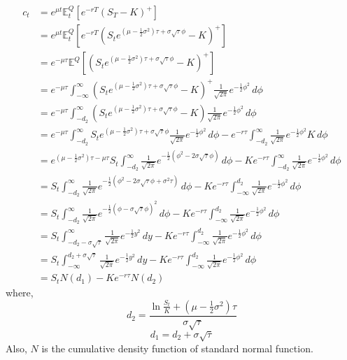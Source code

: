 \begin{equation}
\begin{split}
c_{t} 
&= e^{\mu t}\mathbb{E}_{t}^{Q}[e^{-rT}(S_{T} - K)^{+}]\\
&= e^{\mu t}\mathbb{E}_{t}^{Q}[e^{-rT}(S_{t}e^{(\mu - \frac{1}{2}\sigma^{2})\tau + \sigma\sqrt{\tau}\phi} - K)^{+}]\\
&= e^{-\mu \tau}\mathbb{E}^{Q}[(S_{t}e^{(\mu - \frac{1}{2}\sigma^{2})\tau + \sigma\sqrt{\tau}\phi} - K)^{+}]\\
&= e^{-\mu \tau}\int_{-\infty}^{\infty} (S_{t}e^{(\mu - \frac{1}{2}\sigma^{2})\tau + \sigma\sqrt{\tau}\phi} - K)^{+}\frac{1}{\sqrt{2\pi}}e^{-\frac{1}{2}\phi^{2}}  \, d\phi \\
&= e^{-\mu \tau}\int_{-d_{2}}^{\infty} (S_{t}e^{(\mu - \frac{1}{2}\sigma^{2})\tau + \sigma\sqrt{\tau}\phi} - K)\frac{1}{\sqrt{2\pi}}e^{-\frac{1}{2}\phi^{2}}  \, d\phi \\
&= e^{-\mu \tau}\int_{-d_{2}}^{\infty} S_{t}e^{(\mu - \frac{1}{2}\sigma^{2})\tau + \sigma\sqrt{\tau}\phi}\frac{1}{\sqrt{2\pi}}e^{-\frac{1}{2}\phi^{2}}  \, d\phi - e^{-r\tau}\int_{-d_{2}}^{\infty} \frac{1}{\sqrt{2\pi}}e^{-\frac{1}{2}\phi^{2}}K\, d\phi\\
&= e^{(\mu - \frac{1}{2}\sigma^{2})\tau-\mu \tau}S_{t}\int_{-d_{2}}^{\infty} \frac{1}{\sqrt{2\pi}}e^{-\frac{1}{2}(\phi^{2}-2\sigma\sqrt{\tau}\phi)}  \, d\phi - Ke^{-r\tau}\int_{-d_{2}}^{\infty} \frac{1}{\sqrt{2\pi}}e^{-\frac{1}{2}\phi^{2}}\, d\phi\\
&= S_{t}\int_{-d_{2}}^{\infty} \frac{1}{\sqrt{2\pi}}e^{-\frac{1}{2}(\phi^{2}-2\sigma\sqrt{\tau}\phi+\sigma^{2}\tau)}  \, d\phi - Ke^{-r\tau}\int_{-\infty}^{d_{2}} \frac{1}{\sqrt{2\pi}}e^{-\frac{1}{2}\phi^{2}}\, d\phi\\
&= S_{t}\int_{-d_{2}}^{\infty} \frac{1}{\sqrt{2\pi}}e^{-\frac{1}{2}(\phi-\sigma\sqrt{\tau}\phi)^{2}}  \, d\phi - Ke^{-r\tau}\int_{-\infty}^{d_{2}} \frac{1}{\sqrt{2\pi}}e^{-\frac{1}{2}\phi^{2}}\, d\phi\\
&= S_{t}\int_{-d_{2}-\sigma\sqrt{\tau}}^{\infty} \frac{1}{\sqrt{2\pi}}e^{-\frac{1}{2}y^{2}}  \, dy - Ke^{-r\tau}\int_{-\infty}^{d_{2}} \frac{1}{\sqrt{2\pi}}e^{-\frac{1}{2}\phi^{2}}\, d\phi\\
&= S_{t}\int_{-\infty}^{d_{2}+\sigma\sqrt{\tau}} \frac{1}{\sqrt{2\pi}}e^{-\frac{1}{2}y^{2}}  \, dy - Ke^{-r\tau}\int_{-\infty}^{d_{2}} \frac{1}{\sqrt{2\pi}}e^{-\frac{1}{2}\phi^{2}}\, d\phi\\
&= S_{t} N(d_{1}) - Ke^{-r\tau} N(d_{2})
\end{split}
\end{equation}
where,
$$d_{2} = \frac{\ln{\frac{S_{t}}{K}} + (\mu - \frac{1}{2}\sigma^{2})\tau}{\sigma\sqrt{\tau}}$$
$$d_{1} = d_{2} + \sigma\sqrt{\tau}$$
Also, $N$ is the cumulative density function of standard normal function.
\newpage
